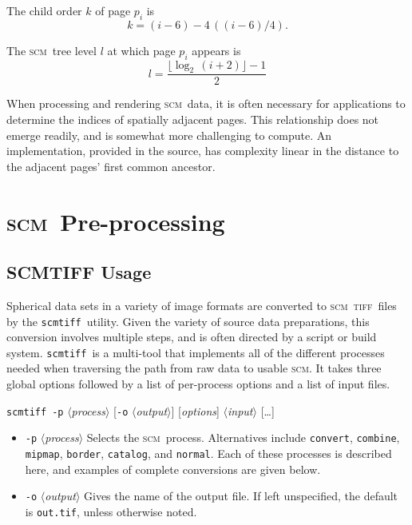 \documentclass[oneside,10pt]{memoir}
\newcommand{\scm}     {\textsc{scm}}
\newcommand{\tiff}    {\textsc{tiff}}
\newcommand{\scmtiff} {\texttt{scmtiff}}
\newcommand{\inangles}[1]{$\langle$#1$\rangle$}
\newenvironment{optionlist}
  {\setlength{\leftmargini}{1in}\begin{itemize}}{\end{itemize}}
\begin{document}
\begin{Spacing}{1.1}
The child order $k$ of page $p_i$ is
\[k=(i-6)-4\,((i-6)/4).\]

The \scm\ tree level $l$ at which page $p_i$ appears is
\[l=\frac{\lfloor\log_2\,(i+2)\rfloor - 1}{2}\]

When processing and rendering \scm\ data, it is often necessary for applications to determine the indices of spatially adjacent pages. This relationship does not emerge readily, and is somewhat more challenging to compute. An implementation, provided in the source, has complexity linear in the distance to the adjacent pages' first common ancestor.


\chapter{\scm\ Pre-processing}

\section{SCMTIFF Usage}

Spherical data sets in a variety of image formats are converted to \scm\ \tiff\ files by the \scmtiff\ utility. Given the variety of source data preparations, this conversion involves multiple steps, and is often directed by a script or build system. \scmtiff\ is a multi-tool that implements all of the different processes needed when traversing the path from raw data to usable \scm. It takes three global options followed by a list of per-process options and a list of input files.

\bigskip\noindent\scmtiff\ \texttt{-p} \inangles{\textit{process}} [\texttt{-o} \inangles{\textit{output}}] [\textit{options}] \inangles{\textit{input}} [\ldots]

\begin{optionlist}
\item[\texttt{-p} \inangles{\textit{process}}] Selects the \scm\ process. Alternatives include \texttt{convert}, \texttt{combine}, \texttt{mipmap}, \texttt{border}, \texttt{catalog}, and \texttt{normal}. Each of these processes is described here, and examples of complete conversions are given below.

\item[\texttt{-o} \inangles{\textit{output}}] Gives the name of the output file. If left unspecified, the default is \texttt{out.tif}, unless otherwise noted.


\end{optionlist}
\end{Spacing}
\end{document}
